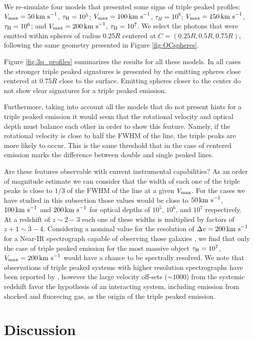 \documentclass{emulateapj}
\newcommand{\kms}{{\ifmmode{{\mathrm{\,km\ s}^{-1}}}\else{\,km~s$^{-1}$}\fi}}
\begin{document}
We re-simulate four models that presented some signs of triple peaked
profiles: $V_{\rm max}=50\kms$, $\tau_{\rm H}=10^{5}$; $V_{\rm
  max}=100\kms$, $\tau_{H}=10^{6}$; $V_{\rm max}=150\kms$, $\tau_{\rm
  H}=10^6$; and $V_{\rm max}=200\kms$, $\tau_{\rm H}=10^{7}$. We
select the photons that were emitted within spheres of radius $0.25R$
centered at $C=(0.25R, 0.5R, 0.75R)$, following the same
geometry presented in Figure \ref{fig:OCspheres}.

Figure \ref{fig:3p_profiles} summarizes the results for all these
models. In all cases the stronger triple peaked signatures is
presented by the emitting spheres close centered at $0.75R$ close to
the surface. Emitting spheres closer to the center do not show clear
signatures for a triple peaked emission.

Furthermore, taking into account all the models that do not present hints for
a triple peaked emission it would seem that the rotational velocity
and optical depth must balance each other in order to show this feature.
 Namely, if the rotational velocity is close to half the FWHM
of the line, the triple peaks are more likely to occur. This is the
same threshold that in the case of centered emission marks the
difference between double and single peaked lines.


Are these features observable with current instrumental capabilities?
As an order of magnitude estimate we can consider that the width of
each one of the triple peaks is close to $1/3$ of the FWHM of the line
at a given $V_{\rm max}$. For the cases we have studied in this
subsection those values would be close to $50\kms$, $100\kms$ and
$200\kms$ for optical depths of $10^5$, $10^6$, and $10^7$
respectively. At a redshift of $z\sim 2-3$ each one of these widths
is multiplied by factors of $z+1\sim 3-4$. Considering a nominal value
for the resolution of $\Delta v=200\kms$ for a Near-IR spectrograph capable of observing
those galaxies \citep{Kulas12}, we find that only the case of triple
peaked emission for the most massive object $\tau_{\rm H}=10^{7}$,
$V_{\rm max}=200\kms$ would have a chance to be spectrally
resolved. We note that observations of triple peaked systems with
higher resolution spectrographs have been reported  by
\cite{Chonis2013}, however the large velocity off-sets ($\sim
1000$\kms) from the systemic redshift favor the hypothesis of an
interacting system, including emission from shocked and fluorecing
gas, as the origin of the triple peaked emission.
\fi

\section{Discussion}
\label{sec:discussion}
\end{document}
